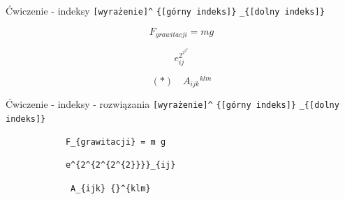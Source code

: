 \documentclass{beamer}
\theoremstyle{newblock}
\begin{document}
\begin{frame}[fragile]{Ćwiczenie \showmycounter - indeksy}
    \centering
    \verb|[wyrażenie]^| \verb|{[górny indeks]}| \verb|_{[dolny indeks]}| 
    
    \begin{examples}
        \begin{equation}
            F_{grawitacji} = m g
        \end{equation}
    \end{examples}
    \begin{examples}
        \begin{equation}
            e^{2^{2^{2^{2}}}}_{ij}
        \end{equation}
    \end{examples}
    \begin{examples}
        \begin{equation}
            (*) \quad A_{ijk} {}^{klm} 
        \end{equation}
    \end{examples}
\end{frame}

\begin{frame}[fragile]{Ćwiczenie  - indeksy - rozwiązania}
    \centering
    \verb|[wyrażenie]^| \verb|{[górny indeks]}| \verb|_{[dolny indeks]}| 
    
    \begin{examples}
        \centering
        \begin{verbatim}
            F_{grawitacji} = m g
        \end{verbatim}
    \end{examples}
    \begin{examples}
        \centering
        \begin{verbatim}
            e^{2^{2^{2^{2}}}}_{ij}
        \end{verbatim}
    \end{examples}
    \begin{examples}
        \centering
        \begin{verbatim}
             A_{ijk} {}^{klm} 
        \end{verbatim}
    \end{examples}
\end{frame}
\end{document}
